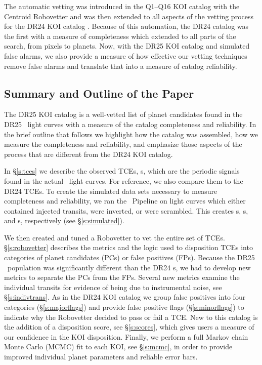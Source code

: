 The automatic vetting was introduced in the Q1--Q16 KOI catalog \citep{Mullally2015cat} with the Centroid Robovetter and was then extended to all aspects of the vetting process for the DR24 KOI catalog \citep{Coughlin2016}. Because of this automation, the DR24 catalog was the first with a measure of completeness which extended to all parts of the search, from pixels to planets.  Now, with the DR25 KOI catalog and simulated false alarms, we also provide a measure of how effective our vetting techniques remove false alarms and translate that into a measure of catalog reliability.

\subsection{Summary and Outline of the Paper}

The DR25 KOI catalog is a well-vetted list of planet candidates found in the DR25 \Kepler\ light curves with a measure of the catalog completeness and reliability. In the brief outline that follows we highlight how the catalog was assembled, how we measure the completeness and reliability, and emphasize those aspects of the process that are different from the DR24 KOI catalog.


In \S\ref{s:tces} we describe the observed TCEs, \opstce s, which are the periodic signals found in the actual \Kepler\ light curves. For reference, we also compare them to the DR24 TCEs. To create the simulated data sets necessary to measure completeness and reliability, we ran the \Kepler\ Pipeline on light curves which either contained injected transits, were inverted, or were scrambled. This creates \injtce s, \invtce s, and \scrtce s, respectively (see \S\ref{s:simulated}).  

We then created and tuned a Robovetter to vet the entire set of TCEs. \S\ref{s:robovetter} describes the metrics and the logic used to disposition TCEs into categories of planet candidates (PCs) or false positives (FPs). Because the DR25 \opstce\ population was significantly different than the DR24 \opstce s, we had to develop new metrics to separate the PCs from the FPs. Several new metrics examine the individual transits for evidence of being due to instrumental noise, see \S\ref{s:indivtrans}. As in the DR24 KOI catalog we group false positives into four categories (\S\ref{s:majorflags}) and provide false positive flags (\S\ref{s:minorflags}) to indicate why the Robovetter decided to pass or fail a TCE.  New to this catalog is the addition of a disposition score, see \S\ref{s:scores}, which gives users a measure of our confidence in the KOI disposition. Finally, we perform a full Markov chain Monte Carlo (MCMC) fit to each KOI, see \S\ref{s:mcmc}, in order to provide improved individual planet parameters and reliable error bars.

